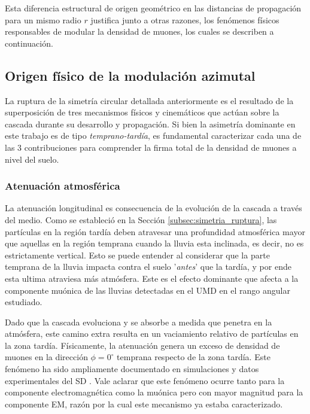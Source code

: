 Esta diferencia estructural de origen geométrico en las distancias de propagación para un mismo radio $r$ justifica junto a otras razones, los fenómenos físicos responsables de modular la densidad de muones, los cuales se describen a continuación.

\subsection{Origen físico de la modulación azimutal}
\label{subsec:origen_fisico}

La ruptura de la simetría circular detallada anteriormente es el resultado de la superposición de tres mecanismos físicos y cinemáticos que actúan sobre la cascada durante su desarrollo y propagación.  Si bien la asimetría dominante en este trabajo es de tipo \textit{temprano-tardía}, es fundamental caracterizar cada una de las 3 contribuciones \cite{GAP2007_124} para comprender la firma total de la densidad de muones a nivel del suelo.

\subsubsection{Atenuación atmosférica}
\label{subsubsec:atenuacion}

La atenuación longitudinal es consecuencia de la evolución de la cascada a través del medio. Como se estableció en la Sección \ref{subsec:simetria_ruptura}, las partículas en la región tardía deben atravesar una profundidad atmosférica mayor que aquellas en la región temprana cuando la lluvia esta inclinada, es decir, no es estrictamente vertical. Esto se puede entender al considerar que la parte temprana de la lluvia impacta contra el suelo '\textit{antes}' que la tardía, y por ende esta ultima atraviesa más atmósfera. Este es el efecto dominante que afecta a la componente muónica de las lluvias detectadas en el UMD en el rango angular estudiado.

Dado que la cascada evoluciona y se absorbe a medida que penetra en la atmósfera, este camino extra resulta en un vaciamiento relativo de partículas en la zona tardía. Físicamente, la atenuación genera un exceso de densidad de muones en la dirección $\phi = 0^\circ$ temprana respecto de la zona tardía. Este fenómeno ha sido ampliamente documentado en simulaciones y datos experimentales del SD \cite{Pryke1998, BradfieldThesis}. Vale aclarar que este fenómeno ocurre tanto para la componente electromagnética como la muónica pero con mayor magnitud para la componente EM, razón por la cual este mecanismo ya estaba caracterizado.

